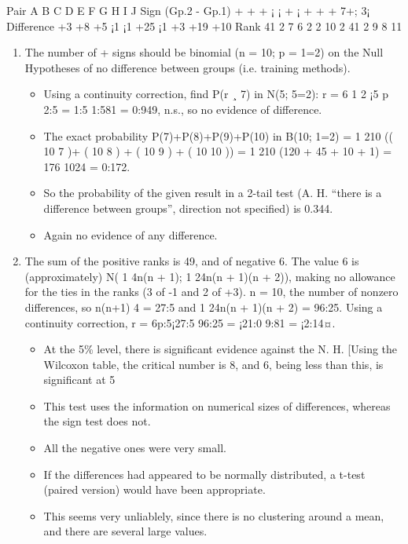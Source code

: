 \documentclass[a4paper,12pt]{article}
\begin{document}
Pair A B C D E F G H I J
Sign (Gp.2 - Gp.1) + + + ¡ ¡ + ¡ + + + 7+; 3¡
Difference +3 +8 +5 ¡1 ¡1 +25 ¡1 +3 +19 +10
Rank 41
2 7 6 2 2 10 2 41
2 9 8
11
\begin{enumerate}

\item  The number of + signs should be binomial (n = 10; p = 1=2) on the Null
Hypotheses of no difference between groups (i.e. training methods). 
\begin{itemize}
\item Using
a continuity correction, find P(r ¸ 7) in N(5; 5=2):
r = 6 1
2
¡5
p
2:5
= 1:5
1:581 = 0:949, n.s., so no evidence of difference.
\item The exact probability P(7)+P(8)+P(9)+P(10) in B(10; 1=2) = 1
210 (( 10
7 )+
( 10
8 ) + ( 10
9 ) + ( 10
10 )) = 1
210 (120 + 45 + 10 + 1) = 176
1024 = 0:172. 
\item So the
probability of the given result in a 2-tail test (A. H. “there is a difference
between groups”, direction not specified) is 0.344. 
\item  Again no evidence of any
difference.
\end{itemize}
\item  The sum of the positive ranks is 49, and of negative 6. The value 6 is
(approximately) N( 1
4n(n + 1); 1
24n(n + 1)(n + 2)), making no allowance for
the ties in the ranks (3 of -1 and 2 of +3). n = 10, the number of nonzero
differences, so n(n+1)
4 = 27:5 and 1
24n(n + 1)(n + 2) = 96:25. Using a
continuity correction, r = 6p:5¡27:5
96:25
= ¡21:0
9:81 = ¡2:14¤.
\begin{itemize}
    \item At the 5\% level, there is significant evidence against the N. H. [Using the
Wilcoxon table, the critical number is 8, and 6, being less than this, is
significant at 5%
\item This test uses the information on numerical sizes of differences, whereas the
sign test does not.
\item All the negative ones were very small.
\item If the differences had appeared to be normally distributed, a t-test (paired
version) would have been appropriate. 
\item This seems very unliablely, since there
is no clustering around a mean, and there are several large values.
\end{itemize}

\end{enumerate}
\end{document}
